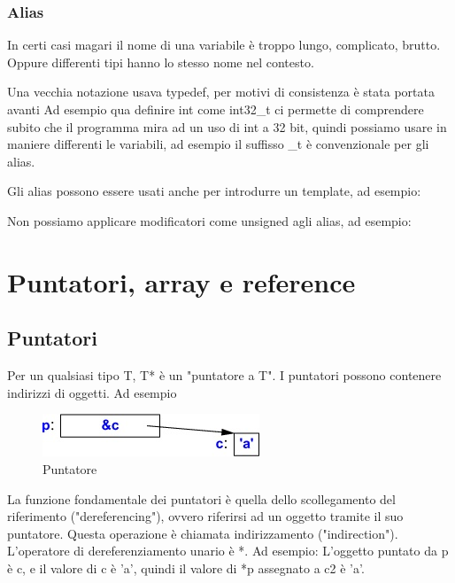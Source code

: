 \documentclass[11pt,a4paper]{book}
\begin{document}
\subsection{Alias}
In certi casi magari il nome di una variabile è troppo lungo, complicato, brutto. Oppure differenti tipi hanno lo stesso nome nel contesto.
\label{code: 072}

Una vecchia notazione usava typedef, per motivi di consistenza è stata portata avanti
\label{code: 073}
Ad esempio qua definire int come int32\_t ci permette di comprendere subito che il programma mira ad un uso di int a 32 bit, quindi possiamo usare in maniere differenti le variabili, ad esempio
\label{code: 074}
il suffisso \_t è convenzionale per gli alias.

Gli alias possono essere usati anche per introdurre un template, ad esempio:
\label{code: 075}

Non possiamo applicare modificatori come unsigned agli alias, ad esempio:
\label{code: 076}

\chapter{Puntatori, array e reference}
\section{Puntatori}
Per un qualsiasi tipo T, T* è un "puntatore a T". I puntatori possono contenere indirizzi di oggetti. Ad esempio
\label{code: 077}
\begin{figure}[h!]
	\begin{center}
		\includegraphics[scale=0.6]{img/015.jpg}
		\caption{Puntatore}
		\label{fig: 015}
	\end{center}
\end{figure}

La funzione fondamentale dei puntatori è quella dello scollegamento del riferimento ("dereferencing"), ovvero riferirsi ad un oggetto tramite il suo puntatore. Questa operazione è chiamata indirizzamento ("indirection"). L'operatore di dereferenziamento unario è *. Ad esempio:
\label{code: 078}
L'oggetto puntato da p è c, e il valore di c è 'a', quindi il valore di *p assegnato a c2 è 'a'.
\end{document}
